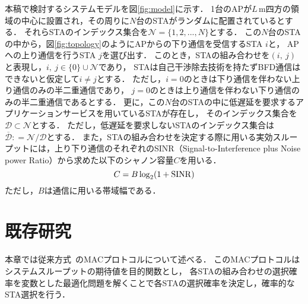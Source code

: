 \documentclass[twocolumn, a4paper]{ieicejsp}
\newcommand{\sij}{(i,\ j)}
\newcommand{\mN}{{\mathcal N}}
\def\coloneqq{\mathrel{\mathop:}=}
\begin{document}
	本稿で検討するシステムモデルを図\ref{fig:model}に示す．
	1台のAPが$L$\,m四方の領域の中心に設置され，その周りに$N$台のSTAがランダムに配置されているとする．
	それらSTAのインデックス集合を$\mN=\{1,2,...,N\}$とする．
	この$N$台のSTAの中から，図\ref{fig:topology}のようにAPからの下り通信を受信するSTA $i$と，
	APへの上り通信を行うSTA $j$を選び出す．
	このとき，STAの組み合わせを$\sij$と表現し，$i,\ j \in \{0\}\cup \mN$であり，
	STAは自己干渉除去技術を持たずBFD通信はできないと仮定して$i\neq j$とする．
	ただし，$i=0$のときは下り通信を伴わない上り通信のみの半二重通信であり，
	$j=0$のときは上り通信を伴わない下り通信のみの半二重通信であるとする．
	更に，この$N$台のSTAの中に低遅延を要求するアプリケーションサービスを用いているSTAが存在し，
	そのインデックス集合を${\mathcal D}\subset\mN$とする．
	ただし，低遅延を要求しないSTAのインデックス集合は${\overline {\mathcal D}}\coloneqq{\mathcal N}/{\mathcal D}$とする．
	また，STAの組み合わせを決定する際に用いる実効スループットには，上り下り通信のそれぞれのSINR（Signal-to-Interference plus Noise power Ratio）から求めた以下のシャノン容量$C$を用いる．
	\begin{equation}
		C=B\log_2(1+{\rm SINR}) \label{eq:capacity}
	\end{equation}
	ただし，$B$は通信に用いる帯域幅である．

\section{既存研究}
	本章では従来方式~\cite{promac}のMACプロトコルについて述べる．
	このMACプロトコルはシステムスループットの期待値を目的関数とし，
	各STAの組み合わせの選択確率を変数とした最適化問題を解くことで各STAの選択確率を決定し，確率的なSTA選択を行う．
\end{document}
